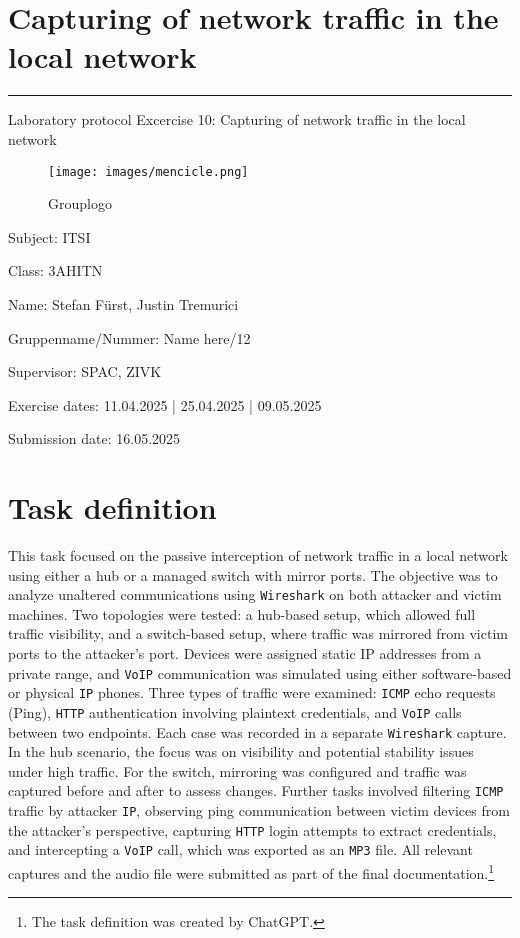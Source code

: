 \documentclass[a4paper]{article}
\newcommand{\abc}{\hfill \break}
\begin{document}

\pagestyle{oida}
\section*{Capturing of network traffic in the local
network}
\par\noindent\rule{\textwidth}{0.4pt}

Laboratory protocol
Excercise 10: Capturing of network traffic in the local
network

\begin{figure}[h]
	\texttt{[image: images/mencicle.png]}
	\caption{Grouplogo}
	\centering
\end{figure}

\vspace*{\fill}
Subject:	ITSI

Class:	3AHITN

Name:	Stefan Fürst, Justin Tremurici

Gruppenname/Nummer: Name here/12

Supervisor: 	SPAC, ZIVK

Exercise dates:	11.04.2025 | 25.04.2025 | 09.05.2025

Submission date: 16.05.2025


\newpage
\tableofcontents

\newpage

\section{Task definition}

This task focused on the passive interception of network traffic in a local network using either a hub or a managed switch with mirror ports. The objective was to analyze unaltered communications using \texttt{Wireshark} on both attacker and victim machines. Two topologies were tested: a hub-based setup, which allowed full traffic visibility, and a switch-based setup, where traffic was mirrored from victim ports to the attacker’s port. Devices were assigned static IP addresses from a private range, and \texttt{VoIP} communication was simulated using either software-based or physical \texttt{IP} phones.\abc
Three types of traffic were examined: \texttt{ICMP} echo requests (Ping), \texttt{HTTP} authentication involving plaintext credentials, and \texttt{VoIP} calls between two endpoints. Each case was recorded in a separate \texttt{Wireshark} capture. In the hub scenario, the focus was on visibility and potential stability issues under high traffic. For the switch, mirroring was configured and traffic was captured before and after to assess changes.\abc
Further tasks involved filtering \texttt{ICMP} traffic by attacker \texttt{IP}, observing ping communication between victim devices from the attacker’s perspective, capturing \texttt{HTTP} login attempts to extract credentials, and intercepting a \texttt{VoIP} call, which was exported as an \texttt{MP3} file. All relevant captures and the audio file were submitted as part of the final documentation.\footnote{The task definition was created by ChatGPT.}
\end{document}
